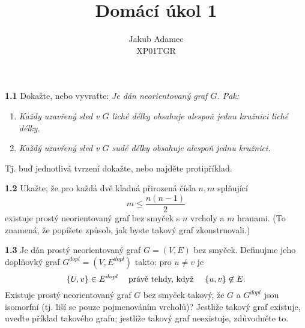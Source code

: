 \documentclass[11pt,a4paper]{article}
\begin{document}
\title{\textbf{Domácí úkol 1}}
\author{Jakub Adamec\\XP01TGR}

\maketitle

\textbf{1.1} Dokažte, nebo vyvraťte: \textit{Je dán neorientovaný graf $G$. Pak:}
\begin{enumerate}[noitemsep]
    \item \textit{Každy uzavřený sled v $G$ liché délky obsahuje alespoň jednu kružnici liché délky.}
    \item \textit{Každý uzavřený sled v $G$ sudé délky obsahuje alespoň jednu kružnici.}
\end{enumerate}
Tj. buď jednotlivá tvrzení dokažte, nebo najděte protipříklad.

\textbf{1.2} Ukažte, že pro každá dvě kladná přirozená čísla $n, m$ splňující
\begin{equation}
    m \leq \frac{n(n-1)}{2}
\end{equation}
existuje prostý neorientovaný graf bez smyček s $n$ vrcholy a $m$ hranami. (To znamená, že popíšete způsob, jak byste 
takový graf zkonstruovali.)

\textbf{1.3} Je dán prostý neorientovaný graf $G = (V,E)$ bez smyček. Definujme jeho doplňovký graf $G^{dopl} = 
(V, E^{dopl})$ takto: pro $u \not= v$ je
\[
    \left\lbrace U, v \right\rbrace \in E^{dopl} \hspace{3mm} \text{ právě tehdy, když } \hspace{3mm} \left\lbrace u, v \right\rbrace \not\in E.
\]
Existuje prostý neorientovaný graf $G$ bez smyček takový, že $G$ a $G^{dopl}$ jsou isomorfní (tj. liší se pouze 
pojmenováním vrcholů)? Jestliže takový graf existuje, uveďte příklad takového grafu; jestliže takový graf neexistuje,
zdůvodněte to.
\end{document}
